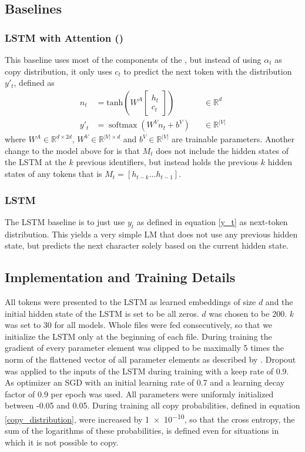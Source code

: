 \documentclass[11pt]{article}
\begin{document}
\subsection{Baselines}
\subsubsection{LSTM with Attention (\lmatt)}
\label{lmatt}
This baseline uses most of the components of the \spn, but instead of using $\alpha_t$ as copy distribution, it only uses $c_t$ to predict the next token with the distribution $y'_t$, defined as
\begin{align}
	{n}_t &= \text{tanh}\left(W^A \begin{bmatrix}
		{h}_t \\
		{c}_t
	\end{bmatrix}
		\right) && \in \mathbb{R}^d \label{eq:ch5-att-combine}\\
	y'_t &= \operatorname{softmax}(W^V n_t + b^V) && \in \mathbb{R}^{|V|} \label{eq:ch5-lm-softmax-2}
\end{align}
where $W^A \in \mathbb{R}^{d \times 2d}$, $W^V \in \mathbb{R}^{|V| \times d}$ and ${b}^V \in \mathbb{R}^{|V|}$ are trainable parameters.
Another change to the model above for \lmatt is that $M_t$ does not include the hidden states of the LSTM at the $k$ previous identifiers, but instead holds the previous $k$ hidden states of any tokens that is $M_t = [h_{t-k}\dots h_{t-1}]$.
\subsubsection{LSTM}
The LSTM baseline is to just use $y_t$ as defined in equation \ref{y_t} as next-token distribution. This yields a very simple LM that does not use any previous hidden state, but predicts the next character solely based on the current hidden state.

\subsection{Implementation and Training Details}
All tokens were presented to the LSTM as learned embeddings of size $d$ and the initial hidden state of the LSTM is set to be all zeros. $d$ was chosen to be 200. $k$ was set to 30 for all models. Whole files were fed consecutively, so that we initialize the LSTM only at the beginning of each file.
During training the gradient of every parameter element was clipped to be maximally 5 times the norm of the flattened vector of all parameter elements as described by \cite{pascanu2012difficulty}.  Dropout was applied to the inputs of the LSTM during training with a keep rate of 0.9. As optimizer an SGD with an initial learning rate of 0.7 and a learning decay factor of 0.9 per epoch was used. All parameters were uniformly initialized between -0.05 and 0.05. During training all copy probabilities, defined in equation \ref{copy_distribution}, were increased by \num{1e-10}, so that the cross entropy, the sum of the logarithms of these probabilities, is defined even for situations in which it is not possible to copy.
\end{document}
